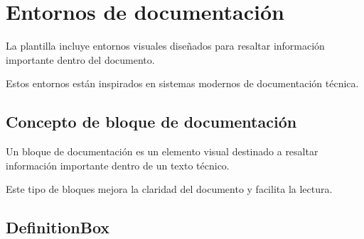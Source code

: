 %
%
%
%
%
%
%
%
%


\chapter{Entornos de documentación}

La plantilla incluye entornos visuales diseñados para
resaltar información importante dentro del documento.

Estos entornos están inspirados en sistemas modernos
de documentación técnica.




\section{Concepto de bloque de documentación}

\begin{definitionbox}
Un bloque de documentación es un elemento visual
destinado a resaltar información importante dentro
de un texto técnico.
\end{definitionbox}

Este tipo de bloques mejora la claridad del documento
y facilita la lectura.




\section{DefinitionBox}

